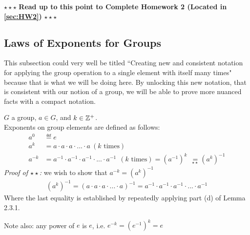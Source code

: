 \begin{tcolorbox}
\begin{center}
    $\star\star\star$ \textbf{Read up to this point to Complete Homework 2 (Located in
    \ref{sec:HW2})} $\star\star\star$
\end{center}
\end{tcolorbox}
\newpage
\subsection{Laws of Exponents for Groups } This subsection could very well be titled ``Creating new
and consistent notation for applying the group operation to a single element with itself many times"
because that is what we will be doing here. By unlocking this new notation, that is consistent with
our notion of a group, we will be able to prove more nuanced facts with a compact
notation.\steezybreak
\begin{definition}
\noindent $G$ a group, $a\in G$, and $k\in {\mathbb{Z}}^+$. \\
Exponents on group elements are defined as follows:
\begin{align}
    a^{0} & \eqdef e \nonumber \\
    a^{k} &= a\cdot a\cdot a \cdot ... \cdot a \ (  k \text{ times} )\nonumber \\
    a^{-k} &= a^{-1}\cdot a^{-1} \cdot a^{-1} \cdot ... \cdot a^{-1} \ \ ( k \text{ times}) = (a^{-1})^k\ \  \underset{\star\star}{=} (a^{k})^{-1} \nonumber
\end{align}
\textit{Proof of $\star\star$:} we wish to show that $a^{-k}=(a^{k})^{-1}$
\begin{align}
    (a^k)^{-1}=(a\cdot a\cdot a \cdot ... \cdot a)^{-1} = a^{-1}\cdot a^{-1}\cdot a^{-1} \cdot ... \cdot a^{-1}\nonumber
\end{align}
Where the last equality is established by repeatedly applying part (d) of Lemma 2.3.1. \steezybreak

\noindent Note also: any power of $e$ is $e$, i.e. $e^{-k}=(e^{-1})^k=e$
\end{definition}

